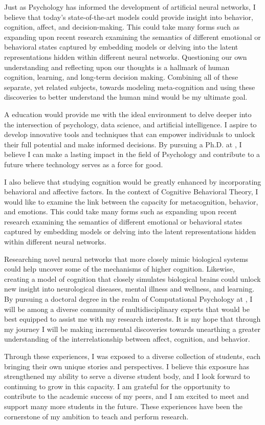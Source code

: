 \documentclass[12pt]{article}
\begin{document}
Just as Psychology has informed the development of artificial neural
networks, I believe that today's state-of-the-art models could provide insight into behavior, cognition, affect, and decision-making. This
could take many forms such as expanding upon recent research examining the semantics of different emotional or behavioral states captured by
embedding models or delving into the latent representations hidden within different neural networks. Questioning our own understanding and
reflecting upon our thoughts is a hallmark of human cognition, learning, and long-term decision making. Combining all of these separate, yet
related subjects, towards modeling meta-cognition and using these discoveries to better understand the human mind would be my ultimate goal.


A \abbrschool education would provide me with the ideal environment to delve deeper into the intersection of psychology, data science, and
artificial intelligence. I aspire to develop innovative tools and techniques that can empower individuals to unlock their full
potential and make informed decisions. By pursuing a Ph.D. at \abbrschool, I believe I can make a lasting impact in the field of
Psychology and contribute to a future where technology serves as a force for good.


I also believe that studying cognition would be greatly enhanced by incorporating behavioral and affective factors. In the context of
Cognitive Behavioral Theory, I would like to examine the link between the capacity for metacognition, behavior, and emotions. This could
take many forms such as expanding upon recent research examining the semantics of different emotional or behavioral states captured by
embedding models or delving into the latent representations hidden within different neural networks.


Researching novel neural networks that more closely mimic biological systems could help uncover some of the mechanisms of higher cognition.
Likewise, creating a model of cognition that closely simulates biological brains could unlock new insight into neurological diseases, mental
illness and wellness, and learning. By pursuing a doctoral degree in the realm of Computational Psychology at \abbrschool, I will be among a
diverse community of multidisciplinary experts that would be best equipped to assist me with my research interests. It is my hope that
through my journey I will be making incremental discoveries towards unearthing a greater understanding of the interrelationship between
affect, cognition, and behavior.


Through these experiences, I was exposed to a diverse collection of students, each bringing their own unique stories and perspectives. I
believe this exposure has strengthened my ability to serve a diverse student body, and I look forward to continuing to grow in this
capacity. I am grateful for the opportunity to contribute to the academic success of my peers, and I am excited to meet and support many
more students in the future. These experiences have been the cornerstone of my ambition to teach and perform research.
\end{document}
